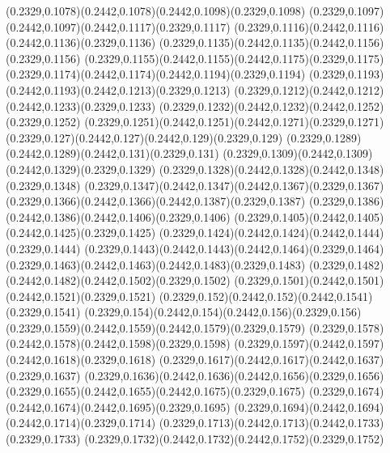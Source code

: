 (0.2329,0.1078)(0.2442,0.1078)(0.2442,0.1098)(0.2329,0.1098)
(0.2329,0.1097)(0.2442,0.1097)(0.2442,0.1117)(0.2329,0.1117)
(0.2329,0.1116)(0.2442,0.1116)(0.2442,0.1136)(0.2329,0.1136)
(0.2329,0.1135)(0.2442,0.1135)(0.2442,0.1156)(0.2329,0.1156)
(0.2329,0.1155)(0.2442,0.1155)(0.2442,0.1175)(0.2329,0.1175)
(0.2329,0.1174)(0.2442,0.1174)(0.2442,0.1194)(0.2329,0.1194)
(0.2329,0.1193)(0.2442,0.1193)(0.2442,0.1213)(0.2329,0.1213)
(0.2329,0.1212)(0.2442,0.1212)(0.2442,0.1233)(0.2329,0.1233)
(0.2329,0.1232)(0.2442,0.1232)(0.2442,0.1252)(0.2329,0.1252)
(0.2329,0.1251)(0.2442,0.1251)(0.2442,0.1271)(0.2329,0.1271)
(0.2329,0.127)(0.2442,0.127)(0.2442,0.129)(0.2329,0.129)
(0.2329,0.1289)(0.2442,0.1289)(0.2442,0.131)(0.2329,0.131)
(0.2329,0.1309)(0.2442,0.1309)(0.2442,0.1329)(0.2329,0.1329)
(0.2329,0.1328)(0.2442,0.1328)(0.2442,0.1348)(0.2329,0.1348)
(0.2329,0.1347)(0.2442,0.1347)(0.2442,0.1367)(0.2329,0.1367)
(0.2329,0.1366)(0.2442,0.1366)(0.2442,0.1387)(0.2329,0.1387)
(0.2329,0.1386)(0.2442,0.1386)(0.2442,0.1406)(0.2329,0.1406)
(0.2329,0.1405)(0.2442,0.1405)(0.2442,0.1425)(0.2329,0.1425)
(0.2329,0.1424)(0.2442,0.1424)(0.2442,0.1444)(0.2329,0.1444)
(0.2329,0.1443)(0.2442,0.1443)(0.2442,0.1464)(0.2329,0.1464)
(0.2329,0.1463)(0.2442,0.1463)(0.2442,0.1483)(0.2329,0.1483)
(0.2329,0.1482)(0.2442,0.1482)(0.2442,0.1502)(0.2329,0.1502)
(0.2329,0.1501)(0.2442,0.1501)(0.2442,0.1521)(0.2329,0.1521)
(0.2329,0.152)(0.2442,0.152)(0.2442,0.1541)(0.2329,0.1541)
(0.2329,0.154)(0.2442,0.154)(0.2442,0.156)(0.2329,0.156)
(0.2329,0.1559)(0.2442,0.1559)(0.2442,0.1579)(0.2329,0.1579)
(0.2329,0.1578)(0.2442,0.1578)(0.2442,0.1598)(0.2329,0.1598)
(0.2329,0.1597)(0.2442,0.1597)(0.2442,0.1618)(0.2329,0.1618)
(0.2329,0.1617)(0.2442,0.1617)(0.2442,0.1637)(0.2329,0.1637)
(0.2329,0.1636)(0.2442,0.1636)(0.2442,0.1656)(0.2329,0.1656)
(0.2329,0.1655)(0.2442,0.1655)(0.2442,0.1675)(0.2329,0.1675)
(0.2329,0.1674)(0.2442,0.1674)(0.2442,0.1695)(0.2329,0.1695)
(0.2329,0.1694)(0.2442,0.1694)(0.2442,0.1714)(0.2329,0.1714)
(0.2329,0.1713)(0.2442,0.1713)(0.2442,0.1733)(0.2329,0.1733)
(0.2329,0.1732)(0.2442,0.1732)(0.2442,0.1752)(0.2329,0.1752)
